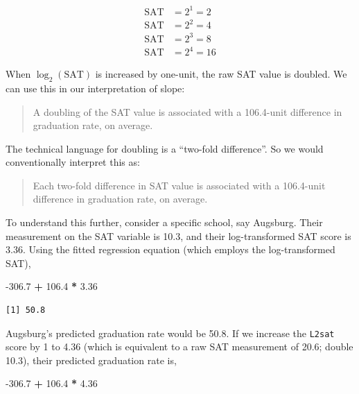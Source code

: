 \documentclass[]{book}
\newenvironment{Shaded}{\begin{snugshade}}{\end{snugshade}}
\newcommand{\FloatTok}[1]{\textcolor[rgb]{0.00,0.00,0.81}{#1}}
\newcommand{\OperatorTok}[1]{\textcolor[rgb]{0.81,0.36,0.00}{\textbf{#1}}}
\newcommand{\StringTok}[1]{\textcolor[rgb]{0.31,0.60,0.02}{#1}}
\begin{document}
\[
\begin{split}
\mathrm{SAT} &= 2^1 = 2\\
\mathrm{SAT} &= 2^2 = 4\\
\mathrm{SAT} &= 2^3 = 8\\
\mathrm{SAT} &= 2^4 = 16
\end{split}
\]

When \(\log_2(\mathrm{SAT})\) is increased by one-unit, the raw SAT value is doubled. We can use this in our interpretation of slope:

\begin{quote}
A doubling of the SAT value is associated with a 106.4-unit difference in graduation rate, on average.
\end{quote}

The technical language for doubling is a ``two-fold difference''. So we would conventionally interpret this as:

\begin{quote}
Each two-fold difference in SAT value is associated with a 106.4-unit difference in graduation rate, on average.
\end{quote}

To understand this further, consider a specific school, say Augsburg. Their measurement on the SAT variable is 10.3, and their log-transformed SAT score is 3.36. Using the fitted regression equation (which employs the log-transformed SAT),

\begin{Shaded}
\begin{Highlighting}[]
\FloatTok{-306.7} \OperatorTok{+}\StringTok{ }\FloatTok{106.4} \OperatorTok{*}\StringTok{ }\FloatTok{3.36}
\end{Highlighting}
\end{Shaded}

\begin{verbatim}
[1] 50.8
\end{verbatim}

Augsburg's predicted graduation rate would be 50.8. If we increase the \texttt{L2sat} score by 1 to 4.36 (which is equivalent to a raw SAT measurement of 20.6; double 10.3), their predicted graduation rate is,

\begin{Shaded}
\begin{Highlighting}[]
\FloatTok{-306.7} \OperatorTok{+}\StringTok{ }\FloatTok{106.4} \OperatorTok{*}\StringTok{ }\FloatTok{4.36}
\end{Highlighting}
\end{Shaded}
\end{document}
